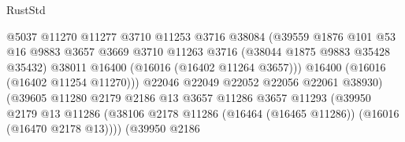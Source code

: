 \begin{lexlean}{RustStd}
\begin{coremodule}
                                            @5037
                                            @11270
                                            @11277
                                            @3710
                                            @11253
                                            @3716
                                            @38084
                                            (@39559
                                              @1876
                                              @101
                                              @53
                                              @16
                                              @9883
                                              @3657
                                              @3669
                                              @3710
                                              @11263
                                              @3716
                                              (@38044 @1875 @9883 @35428 @35432)
                                              @38011
                                              @16400
                                              (@16016 (@16402 @11264 @3657)))
                                            @16400
                                            (@16016 (@16402 @11254 @11270)))
                                          @22046
                                          @22049
                                          @22052
                                          @22056
                                          @22061
                                          @38930)
                                        (@39605
                                          @11280
                                          @2179
                                          @2186
                                          @13
                                          @3657
                                          @11286
                                          @3657
                                          @11293
                                          (@39950
                                            @2179
                                            @13
                                            @11286
                                            (@38106
                                              @2178
                                              @11286
                                              (@16464 (@16465 @11286))
                                              (@16016 (@16470 @2178 @13))))
                                          (@39950
                                            @2186

\end{coremodule}
\end{lexlean}
